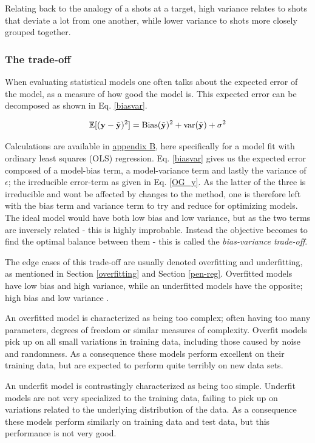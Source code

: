 Relating back to the analogy of a shots at a target, high variance relates to shots that deviate a lot from one another, while lower variance to shots more closely grouped together.  

\subsubsection{The trade-off}


When evaluating statistical models one often talks about the expected error of the model, as a measure of how good the model is. This expected error can be decomposed as shown in Eq. \ref{biasvar}. 

\begin{equation}\label{biasvar}
    \mathbb{E}[(\mathbf{y} - \Tilde{\mathbf{y}})^2] = \text{Bias}(\Tilde{\mathbf{y}})^2 + \text{var}(\Tilde{\mathbf{y}}) + \sigma^2
\end{equation}

Calculations are available in \hyperref[appendixB]{appendix B}, here specifically for a model fit with ordinary least squares (OLS) regression. 
Eq. \ref{biasvar} gives us the expected error composed of a model-bias term, a model-variance term and lastly the variance of $\epsilon$; the irreducible error-term as given in Eq. \ref{OG_y}. As the latter of the three is irreducible and wont be affected by changes to the method, one is therefore left with the bias term and variance term to try and reduce for optimizing models. 
The ideal model would have both low bias and low variance, but as the two terms are inversely related - this is highly improbable. Instead the objective becomes to find the optimal balance between them - this is called the \textit{bias-variance trade-off}. 

The edge cases of this trade-off are usually denoted overfitting and underfitting, as mentioned in Section \ref{overfitting} and Section \ref{pen-reg}. Overfitted models have low bias and high variance, while an underfitted models have the opposite; high bias and low variance \cite[Statistical interpretations and Resampling Methods]{morten}. 

An overfitted model is characterized as being too complex; often having too many parameters, degrees of freedom or similar measures of complexity. 
Overfit models pick up on all small variations in training data, including those caused by noise and randomness. As a consequence these models perform excellent on their training data, but are expected to perform quite terribly on new data sets. 

An underfit model is contrastingly characterized as being too simple. Underfit models are not very specialized to the training data, failing to pick up on variations related to the underlying distribution of the data. As a consequence these models perform similarly on training data and test data, but this performance is not very good. 